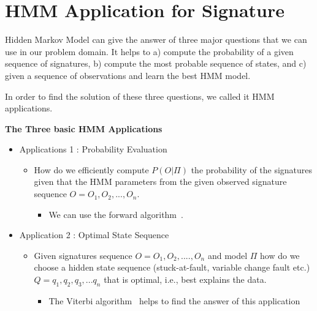 \section{HMM Application for Signature}

Hidden Markov Model can give the answer of three major questions that we can use in our problem domain. It helps to a) compute the probability of a given sequence of signatures, b) compute the most probable sequence of states, and c) given a sequence of observations and learn the best HMM model.

In order to find the solution of these three questions, we called it HMM applications.


\textbf{The Three basic HMM Applications}

\begin{itemize}
\item Applications 1 : Probability Evaluation
 \begin{itemize}
 \item How do we efficiently compute $P(O|\Pi)$ the probability of the signatures given that the HMM parameters from the given observed signature sequence $O = {O_1, O_2,...,O_n}$.
 
  \begin{itemize}
  \item We can use the forward algorithm~\cite{ghahramani1996factorial}.
  \end{itemize}
 \end{itemize}
\end{itemize}

\begin{itemize}
\item Application 2 : Optimal State Sequence
 \begin{itemize}
 \item Given signatures sequence $O = {O_1, O_2,....,}O_n$ and model $\Pi$ how do we choose a hidden state sequence (stuck-at-fault, variable change fault etc.) $Q={q_1,q_2,q_3,...q_n}$
that is optimal, i.e., best explains the data. 
  \begin{itemize}
  \item The Viterbi algorithm~\cite{forney1973viterbi} helps to find the answer of this application
  \end{itemize}
 \end{itemize}
\end{itemize}




